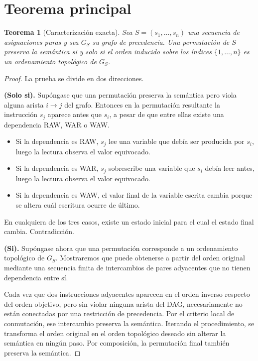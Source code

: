\documentclass[letterpaper,oneside]{article}
\newtheorem{theorem}[definition]{Teorema}
\theoremstyle{remark}
\begin{document}
\section{Teorema principal}

\begin{theorem}[Caracterización exacta]
Sea $S=(s_1,\dots,s_n)$ una secuencia de asignaciones puras y sea $G_S$ su grafo de precedencia. Una permutación de $S$ preserva la semántica si y solo si el orden inducido sobre los índices $\{1,\dots,n\}$ es un ordenamiento topológico de $G_S$.
\end{theorem}

\begin{proof}
La prueba se divide en dos direcciones.

\smallskip
\textbf{(Solo si).} Supóngase que una permutación preserva la semántica pero viola alguna arista $i \to j$ del grafo. Entonces en la permutación resultante la instrucción $s_j$ aparece antes que $s_i$, a pesar de que entre ellas existe una dependencia RAW, WAR o WAW.

\begin{itemize}[leftmargin=2.2em]
  \item Si la dependencia es RAW, $s_j$ lee una variable que debía ser producida por $s_i$, luego la lectura observa el valor equivocado.
  \item Si la dependencia es WAR, $s_j$ sobrescribe una variable que $s_i$ debía leer antes, luego la lectura observa el valor equivocado.
  \item Si la dependencia es WAW, el valor final de la variable escrita cambia porque se altera cuál escritura ocurre de último.
\end{itemize}

En cualquiera de los tres casos, existe un estado inicial para el cual el estado final cambia. Contradicción.

\smallskip
\textbf{(Si).} Supóngase ahora que una permutación corresponde a un ordenamiento topológico de $G_S$. Mostraremos que puede obtenerse a partir del orden original mediante una secuencia finita de intercambios de pares adyacentes que no tienen dependencia entre sí.

Cada vez que dos instrucciones adyacentes aparecen en el orden inverso respecto del orden objetivo, pero sin violar ninguna arista del DAG, necesariamente no están conectadas por una restricción de precedencia. Por el criterio local de conmutación, ese intercambio preserva la semántica. Iterando el procedimiento, se transforma el orden original en el orden topológico deseado sin alterar la semántica en ningún paso. Por composición, la permutación final también preserva la semántica.
\end{proof}
\end{document}
